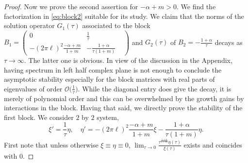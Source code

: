 \documentclass[a4paper,11pt]{article}
\def\l{(2\pi \ell)}
\def\k{(2\pi \ell)}
\theoremstyle{remark}
\begin{document}
\begin{proof}
Now we prove the second assertion for $-\alpha+m>0$. We find the factorization in \eqref{eq:block2} suitable for its study.
We claim that the norms of the solution operator $G_1(\tau)$ associated to the block $B_1=\begin{pmatrix} 0 & \frac{1}{\tau} \\-\k^2\frac{-\alpha+m}{1+m} & -\frac{1+\alpha}{\tau(1+m)} & \end{pmatrix}$ and $G_2(\tau)$ of $B_2 = -\frac{1+\alpha}{\tau}$ decays as $\tau \rightarrow \infty.$ The latter one is obvious.
In view of the discussion in the Appendix, having spectrum in left half complex plane is not enough to conclude the asymptotic stability especially for the block matrices with real parts of eigenvalues of order $\mathcal{O}\big(\frac{1}{\tau}\big)$. While the diagonal entry does give the decay, it is merely of polynomial order and this can be overwhelmed by the growth gains by interactions in the block. 
Having that said, we directly prove the stability of the first block.
We consider $2$ by $2$ system, $$\xi' = \frac{1}{\tau} \eta, \quad \eta' = -\l^2\frac{-\alpha+m}{1+m}\xi -\frac{1+\alpha}{\tau(1+m)}\eta.$$
First note that unless otherwise $\xi\equiv\eta\equiv 0$, $\displaystyle\lim_{\tau \rightarrow 0} \frac{\tau^{\frac{1+\alpha}{1+m}}\eta(\tau)}{\xi(\tau)}$ exists and coincides with $0$.


\end{proof}
\end{document}
